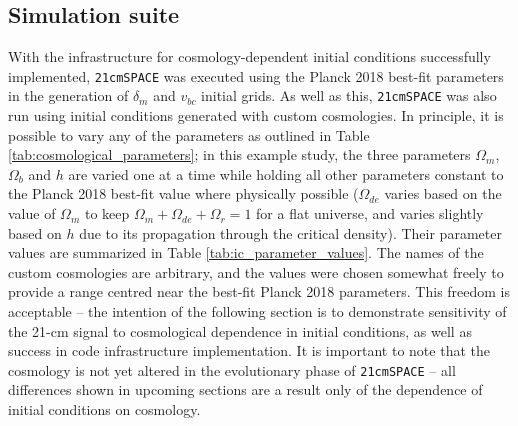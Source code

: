 \documentclass[floats,floatfix,showpacs,amssymb,prd,superscriptaddress,nofootinbib, 11pt]{revtex4-2} %
\newcommand{\code}{\texttt}
\begin{document}
\subsection{Simulation suite}
With the infrastructure for cosmology-dependent initial conditions successfully implemented, \code{21cmSPACE} was executed using the Planck 2018 best-fit parameters \citep{Planck2018results} in the generation of $\delta_m$ and $v_{bc}$ initial grids. As well as this, \code{21cmSPACE} was also run using initial conditions generated with custom cosmologies. In principle, it is possible to vary any of the parameters as outlined in Table \ref{tab:cosmological_parameters}; in this example study, the three parameters $\Omega_m$, $\Omega_b$ and $h$ are varied one at a time while holding all other parameters constant to the Planck 2018 best-fit value where physically possible ($\Omega_{de}$ varies based on the value of $\Omega_m$ to keep $\Omega_m + \Omega_{de} + \Omega_r= 1$ for a flat universe, and varies slightly based on $h$ due to its propagation through the critical density). Their parameter values are summarized in Table \ref{tab:ic_parameter_values}. The names of the custom cosmologies are arbitrary, and the values were chosen somewhat freely to provide a range centred near the best-fit Planck 2018 parameters. This freedom is acceptable -- the intention of the following section is to demonstrate sensitivity of the 21-cm signal to cosmological dependence in initial conditions, as well as success in code infrastructure implementation. It is important to note that the cosmology is not yet altered in the evolutionary phase of \code{21cmSPACE} -- all differences shown in upcoming sections are a result only of the dependence of initial conditions on cosmology. 
\end{document}
